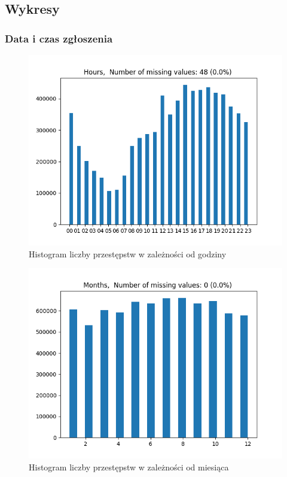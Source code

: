 \documentclass{classrep}
\begin{document}
{        \subsection{Wykresy} {

            \subsubsection{Data i czas zgłoszenia} {

                \begin{figure}[!htbp]
                    \centering
                    \includegraphics[width=\textwidth]{img/Hours-133549.png}
                    \caption{Histogram liczby przestępstw w zależności od godziny}
                    \label{hist_hours}
                \end{figure}
                \begin{figure}[!htbp]
                    \centering
                    \includegraphics[width=\textwidth]{img/Months-133554.png}
                    \caption{Histogram liczby przestępstw w zależności od miesiąca}
                    \label{hist_months}
                \end{figure}
                \FloatBarrier

}}}
\end{document}
